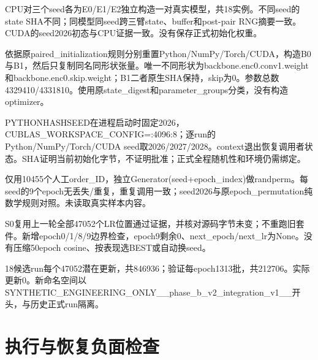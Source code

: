 \documentclass[UTF8,fontset=fandol,10pt]{ctexart}
\begin{document}
CPU对三个seed各为E0/\allowbreak{}E1/\allowbreak{}E2独立构造一对真实模型，共18实例。不同seed的state SHA不同；同模型同seed跨三臂state、buffer和post-pair RNG摘要一致。CUDA的seed2026初态与CPU证据一致。没有保存正式初始化权重。

依据原paired\_\allowbreak{}initialization规则分别重置Python/\allowbreak{}NumPy/\allowbreak{}Torch/\allowbreak{}CUDA，构造B0与B1，然后只复制同名同形状张量。唯一不同形状为backbone.enc0.conv1.weight和backbone.enc0.skip.weight；B1二者原生SHA保持，skip为0。参数总数4329410/\allowbreak{}4331810。使用原state\_\allowbreak{}digest和parameter\_\allowbreak{}groups分类，没有构造optimizer。

PYTHONHASHSEED在进程启动时固定2026，CUBLAS\_\allowbreak{}WORKSPACE\_\allowbreak{}CONFIG=:4096:8；逐run的Python/\allowbreak{}NumPy/\allowbreak{}Torch/\allowbreak{}CUDA seed取2026/\allowbreak{}2027/\allowbreak{}2028。context退出恢复调用者状态。SHA证明当前初始化字节，不证明批准；正式全程随机性和环境仍需绑定。

仅用10455个人工order\_\allowbreak{}ID，独立Generator(seed+epoch\_\allowbreak{}index)做randperm。每seed的9个epoch无丢失/\allowbreak{}重复，重复调用一致；seed2026与原epoch\_\allowbreak{}permutation纯数学规则对照。未读取真实样本内容。

S0复用上一轮全部47052个LR位置通过证据，并核对源码字节未变；不重跑旧套件。新增epoch0/\allowbreak{}1/\allowbreak{}8/\allowbreak{}9边界检查，epoch9剩余0、next\_\allowbreak{}epoch/\allowbreak{}next\_\allowbreak{}lr为None。没有压缩50epoch cosine、按表现选BEST或自动换seed。

18候选run每个47052潜在更新，共846936；验证每epoch1313批，共212706。实际更新0。新命名空间以SYNTHETIC\_\allowbreak{}ENGINEERING\_\allowbreak{}ONLY\_\allowbreak{}\_\allowbreak{}phase\_\allowbreak{}b\_\allowbreak{}v2\_\allowbreak{}integration\_\allowbreak{}v1\_\allowbreak{}\_\allowbreak{}开头，与历史正式run隔离。
\clearpage\section{执行与恢复负面检查}
\end{document}
